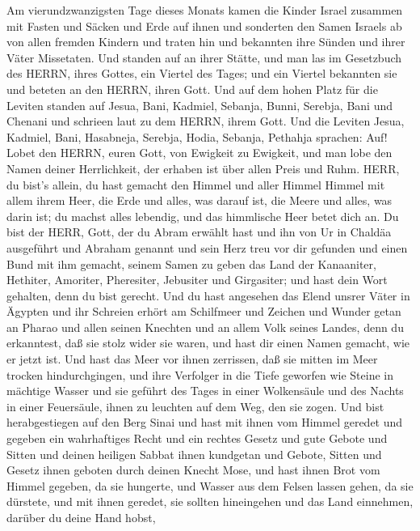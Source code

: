  Am vierundzwanzigsten Tage dieses Monats kamen die Kinder
Israel zusammen mit Fasten und Säcken und Erde auf ihnen 
und sonderten den Samen Israels ab von allen fremden Kindern und traten
hin und bekannten ihre Sünden und ihrer Väter Missetaten. 
Und standen auf an ihrer Stätte, und man las im Gesetzbuch des HERRN,
ihres Gottes, ein Viertel des Tages; und ein Viertel bekannten sie und
beteten an den HERRN, ihren Gott.  Und auf dem hohen Platz
für die Leviten standen auf Jesua, Bani, Kadmiel, Sebanja, Bunni,
Serebja, Bani und Chenani und schrieen laut zu dem HERRN, ihrem Gott.
 Und die Leviten Jesua, Kadmiel, Bani, Hasabneja, Serebja,
Hodia, Sebanja, Pethahja sprachen: Auf! Lobet den HERRN, euren Gott, von
Ewigkeit zu Ewigkeit, und man lobe den Namen deiner Herrlichkeit, der
erhaben ist über allen Preis und Ruhm.  HERR, du bist's
allein, du hast gemacht den Himmel und aller Himmel Himmel mit allem
ihrem Heer, die Erde und alles, was darauf ist, die Meere und alles, was
darin ist; du machst alles lebendig, und das himmlische Heer betet dich
an.  Du bist der HERR, Gott, der du Abram erwählt hast und
ihn von Ur in Chaldäa ausgeführt und Abraham genannt  und
sein Herz treu vor dir gefunden und einen Bund mit ihm gemacht, seinem
Samen zu geben das Land der Kanaaniter, Hethiter, Amoriter, Pheresiter,
Jebusiter und Girgasiter; und hast dein Wort gehalten, denn du bist
gerecht.  Und du hast angesehen das Elend unsrer Väter in
Ägypten und ihr Schreien erhört am Schilfmeer  und Zeichen
und Wunder getan an Pharao und allen seinen Knechten und an allem Volk
seines Landes, denn du erkanntest, daß sie stolz wider sie waren, und
hast dir einen Namen gemacht, wie er jetzt ist.  Und hast
das Meer vor ihnen zerrissen, daß sie mitten im Meer trocken
hindurchgingen, und ihre Verfolger in die Tiefe geworfen wie Steine in
mächtige Wasser  und sie geführt des Tages in einer
Wolkensäule und des Nachts in einer Feuersäule, ihnen zu leuchten auf
dem Weg, den sie zogen.  Und bist herabgestiegen auf den
Berg Sinai und hast mit ihnen vom Himmel geredet und gegeben ein
wahrhaftiges Recht und ein rechtes Gesetz und gute Gebote und Sitten
 und deinen heiligen Sabbat ihnen kundgetan und Gebote,
Sitten und Gesetz ihnen geboten durch deinen Knecht Mose, 
und hast ihnen Brot vom Himmel gegeben, da sie hungerte, und Wasser aus
dem Felsen lassen gehen, da sie dürstete, und mit ihnen geredet, sie
sollten hineingehen und das Land einnehmen, darüber du deine Hand hobst,
